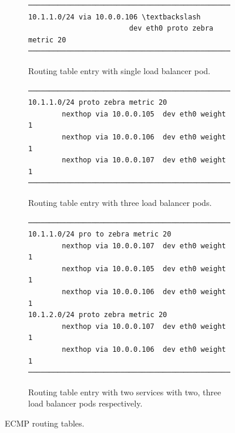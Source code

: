 \begin{figure}[h]

\begin{subfigure}[t]{\columnwidth}
\centering
\begin{Verbatim}[commandchars=\\\{\}]
───────────────────────────────────────────────────────
10.1.1.0/24 via 10.0.0.106 \textbackslash 
                        dev eth0 proto zebra metric 20
───────────────────────────────────────────────────────
\end{Verbatim}
\caption{Routing table entry with single load balancer pod.}
\label{fig:single}
\end{subfigure}
\par\bigskip

\begin{subfigure}[t]{\columnwidth}
\centering
\begin{Verbatim}[commandchars=\\\{\}]
───────────────────────────────────────────────────────
10.1.1.0/24 proto zebra metric 20
        nexthop via 10.0.0.105  dev eth0 weight 1
        nexthop via 10.0.0.106  dev eth0 weight 1
        nexthop via 10.0.0.107  dev eth0 weight 1
───────────────────────────────────────────────────────
\end{Verbatim}
\caption{Routing table entry with three load balancer pods.}
\label{fig:three}
\end{subfigure}
\par\bigskip

\begin{subfigure}[t]{\columnwidth}
\centering
\begin{Verbatim}[commandchars=\\\{\}]
───────────────────────────────────────────────────────
10.1.1.0/24 pro to zebra metric 20
        nexthop via 10.0.0.107  dev eth0 weight 1
        nexthop via 10.0.0.105  dev eth0 weight 1
        nexthop via 10.0.0.106  dev eth0 weight 1
10.1.2.0/24 proto zebra metric 20
        nexthop via 10.0.0.107  dev eth0 weight 1
        nexthop via 10.0.0.106  dev eth0 weight 1
───────────────────────────────────────────────────────
\end{Verbatim}
\caption{Routing table entry with two services with two, three load balancer pods respectively.}
\label{fig:double_svc}
\end{subfigure}
\par\bigskip

\caption{ECMP routing tables.}
\label{fig:exabgp_routing_table}
\end{figure}

